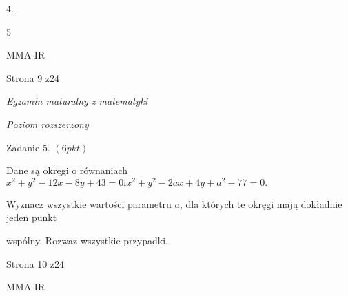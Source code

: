 \documentclass[a4paper,12pt]{article}
\begin{document}
4.

5

MMA-IR

Strona 9 z24





{\it Egzamin maturalny z matematyki}

{\it Poziom rozszerzony}

Zadanie 5. $(6pkt)$

Dane są okręgi o równaniach $x^{2}+y^{2}-12x-8y+43=0 \mathrm{i} x^{2}+y^{2}-2ax+4y+a^{2}-77=0.$

Wyznacz wszystkie wartości parametru $a$, dla których te okręgi mają dokładnie jeden punkt

wspólny. Rozwaz wszystkie przypadki.

Strona 10 z24

MMA-IR
\end{document}
